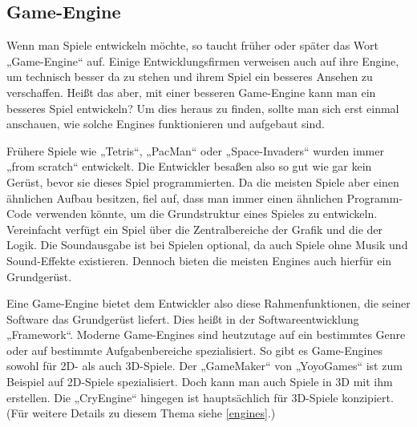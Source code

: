 \subsection{Game-Engine}	
\label{engine}
Wenn man Spiele entwickeln möchte, so taucht früher oder später das Wort „Game-Engine“ auf. Einige Entwicklungsfirmen verweisen auch auf ihre Engine, um technisch besser da zu stehen und ihrem Spiel ein besseres Ansehen zu verschaffen. Heißt das aber, mit einer besseren Game-Engine kann man ein besseres Spiel entwickeln? Um dies heraus zu finden, sollte man sich erst einmal anschauen, wie solche Engines funktionieren und aufgebaut sind.

Frühere Spiele wie „Tetris“, „PacMan“ oder „Space-Invaders“ wurden immer „from scratch“  entwickelt. Die Entwickler besaßen also so gut wie gar kein Gerüst, bevor sie dieses Spiel programmierten. Da die meisten Spiele aber einen ähnlichen Aufbau besitzen, fiel auf, dass man immer einen ähnlichen Programm-Code verwenden könnte, um die Grundstruktur eines Spieles zu entwickeln. Vereinfacht verfügt ein Spiel über die Zentralbereiche der Grafik und die der Logik. Die Soundausgabe ist bei Spielen optional, da auch Spiele ohne Musik und Sound-Effekte existieren. Dennoch bieten die meisten Engines auch hierfür ein Grundgerüst.

Eine Game-Engine bietet dem Entwickler also diese Rahmenfunktionen, die seiner Software das Grundgerüst liefert. Dies heißt in der Softwareentwicklung „Framework“. 
Moderne Game-Engines sind heutzutage auf ein bestimmtes Genre oder auf bestimmte Aufgabenbereiche spezialisiert. So gibt es Game-Engines sowohl für 2D- als auch 3D-Spiele. Der „GameMaker“ von „YoyoGames“ ist zum Beispiel auf 2D-Spiele spezialisiert. Doch kann man auch Spiele in 3D mit ihm erstellen. Die „CryEngine“ hingegen ist hauptsächlich für 3D-Spiele konzipiert. (Für weitere Details zu diesem Thema siehe \ref{engines}.)
